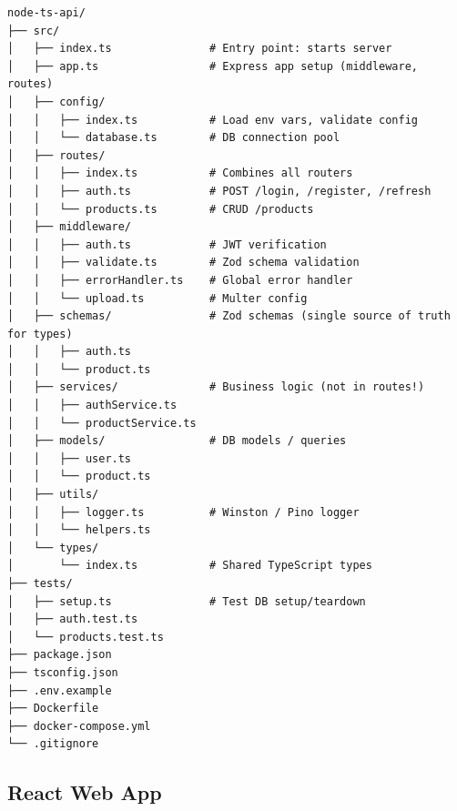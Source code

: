 \documentclass[10pt, a4paper]{article}
\begin{document}
\begin{lstlisting}
node-ts-api/
├── src/
│   ├── index.ts               # Entry point: starts server
│   ├── app.ts                 # Express app setup (middleware, routes)
│   ├── config/
│   │   ├── index.ts           # Load env vars, validate config
│   │   └── database.ts        # DB connection pool
│   ├── routes/
│   │   ├── index.ts           # Combines all routers
│   │   ├── auth.ts            # POST /login, /register, /refresh
│   │   └── products.ts        # CRUD /products
│   ├── middleware/
│   │   ├── auth.ts            # JWT verification
│   │   ├── validate.ts        # Zod schema validation
│   │   ├── errorHandler.ts    # Global error handler
│   │   └── upload.ts          # Multer config
│   ├── schemas/               # Zod schemas (single source of truth for types)
│   │   ├── auth.ts
│   │   └── product.ts
│   ├── services/              # Business logic (not in routes!)
│   │   ├── authService.ts
│   │   └── productService.ts
│   ├── models/                # DB models / queries
│   │   ├── user.ts
│   │   └── product.ts
│   ├── utils/
│   │   ├── logger.ts          # Winston / Pino logger
│   │   └── helpers.ts
│   └── types/
│       └── index.ts           # Shared TypeScript types
├── tests/
│   ├── setup.ts               # Test DB setup/teardown
│   ├── auth.test.ts
│   └── products.test.ts
├── package.json
├── tsconfig.json
├── .env.example
├── Dockerfile
├── docker-compose.yml
└── .gitignore
\end{lstlisting}


\subsection{React Web App}
\end{document}
